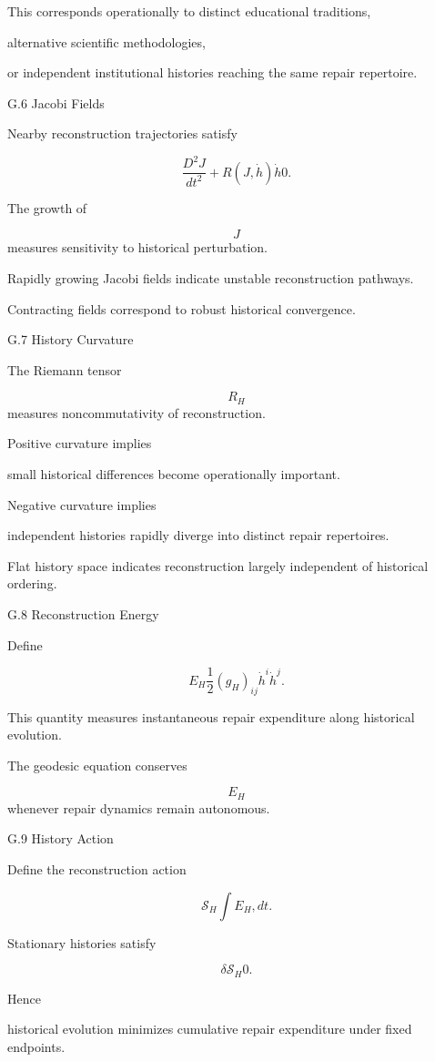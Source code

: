 \documentclass[12pt,oneside]{article}
\theoremstyle{plain}
\theoremstyle{definition}
\theoremstyle{remark}
\begin{document}
This corresponds operationally to distinct educational traditions,

alternative scientific methodologies,

or independent institutional histories reaching the same repair repertoire.


G.6 Jacobi Fields

Nearby reconstruction trajectories satisfy

\[
\frac{D^2J}{dt^2}
+
R(J,\dot h)\dot h
0. 

\]

The growth of

\[
J
\]
measures sensitivity to historical perturbation.

Rapidly growing Jacobi fields indicate unstable reconstruction pathways.

Contracting fields correspond to robust historical convergence.


G.7 History Curvature

The Riemann tensor

\[
R_H
\]
measures noncommutativity of reconstruction.

Positive curvature implies

small historical differences become operationally important.

Negative curvature implies

independent histories rapidly diverge into distinct repair repertoires.

Flat history space indicates reconstruction largely independent of historical ordering.


G.8 Reconstruction Energy

Define

\[
E_H
\frac12
(g_H)_{ij}
\dot h^i
\dot h^j.
\]

This quantity measures instantaneous repair expenditure along historical evolution.

The geodesic equation conserves

\[
E_H
\]
whenever repair dynamics remain autonomous.


G.9 History Action

Define the reconstruction action

\[
\mathcal S_H
\int
E_H
,dt.
\]

Stationary histories satisfy

\[
\delta
\mathcal S_H
0. 

\]

Hence

historical evolution minimizes cumulative repair expenditure under fixed endpoints.
\end{document}
